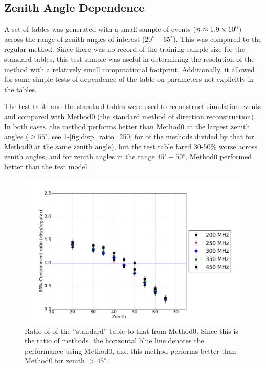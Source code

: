 \documentclass[main.tex]{subfiles}
\begin{document}
\subsection{Zenith Angle Dependence}
A set of \disp tables was generated with a small sample of events ($n\approx 1.9\times 10^{6}$) across the range of zenith angles of interest ($20^\circ-65^\circ$). This was compared to the regular \disp method. Since there was no record of the training sample size for the standard tables, this test sample was useful in determining the resolution of the \disp method with a relatively small computational footprint. Additionally, it allowed for some simple tests of dependence of the \disp table on parameters not explicitly in the \disp tables.

The test \disp table and the standard \disp tables were used to reconstruct simulation events and compared with Method0 (the standard method of direction reconstruction). In both cases, the \disp method performs better than Method0 at the largest zenith angles ($\geq 55^\circ$, see \ref{fig:olddisp_ratio}-\ref{fig:disp_ratio_250} for \rse of the \disp methods divided by that for Method0 at the same zenith angle), but the test \disp table fared 30-50\% worse across zenith angles, and for zenith angles in the range $45^\circ-50^\circ$, Method0 performed better than the test model. 

\begin{figure}[htbp]
  \begin{center}
      \includegraphics[width=0.8\linewidth]{images/disp_standard_ratio_xzen}
      \caption[``standard'' \disp table reconstruction.]{Ratio of \rse of the ``standard'' \disp table to that from Method0. Since this is the ratio of methods, the horizontal blue line denotes the performance using Method0, and this method performs better than Method0 for zenith $>45^\circ$.}  
      \label{fig:olddisp_ratio}
  \end{center}
\end{figure}
\end{document}
